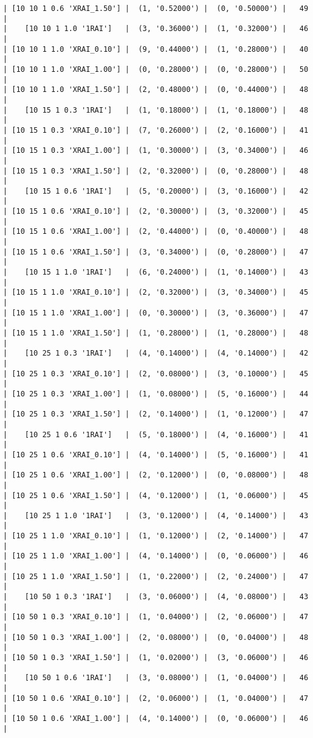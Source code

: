 \documentclass{article}
\begin{document}
\begin{verbatim}
| [10 10 1 0.6 'XRAI_1.50'] |  (1, '0.52000') |  (0, '0.50000') |   49  |
|    [10 10 1 1.0 '1RAI']   |  (3, '0.36000') |  (1, '0.32000') |   46  |
| [10 10 1 1.0 'XRAI_0.10'] |  (9, '0.44000') |  (1, '0.28000') |   40  |
| [10 10 1 1.0 'XRAI_1.00'] |  (0, '0.28000') |  (0, '0.28000') |   50  |
| [10 10 1 1.0 'XRAI_1.50'] |  (2, '0.48000') |  (0, '0.44000') |   48  |
|    [10 15 1 0.3 '1RAI']   |  (1, '0.18000') |  (1, '0.18000') |   48  |
| [10 15 1 0.3 'XRAI_0.10'] |  (7, '0.26000') |  (2, '0.16000') |   41  |
| [10 15 1 0.3 'XRAI_1.00'] |  (1, '0.30000') |  (3, '0.34000') |   46  |
| [10 15 1 0.3 'XRAI_1.50'] |  (2, '0.32000') |  (0, '0.28000') |   48  |
|    [10 15 1 0.6 '1RAI']   |  (5, '0.20000') |  (3, '0.16000') |   42  |
| [10 15 1 0.6 'XRAI_0.10'] |  (2, '0.30000') |  (3, '0.32000') |   45  |
| [10 15 1 0.6 'XRAI_1.00'] |  (2, '0.44000') |  (0, '0.40000') |   48  |
| [10 15 1 0.6 'XRAI_1.50'] |  (3, '0.34000') |  (0, '0.28000') |   47  |
|    [10 15 1 1.0 '1RAI']   |  (6, '0.24000') |  (1, '0.14000') |   43  |
| [10 15 1 1.0 'XRAI_0.10'] |  (2, '0.32000') |  (3, '0.34000') |   45  |
| [10 15 1 1.0 'XRAI_1.00'] |  (0, '0.30000') |  (3, '0.36000') |   47  |
| [10 15 1 1.0 'XRAI_1.50'] |  (1, '0.28000') |  (1, '0.28000') |   48  |
|    [10 25 1 0.3 '1RAI']   |  (4, '0.14000') |  (4, '0.14000') |   42  |
| [10 25 1 0.3 'XRAI_0.10'] |  (2, '0.08000') |  (3, '0.10000') |   45  |
| [10 25 1 0.3 'XRAI_1.00'] |  (1, '0.08000') |  (5, '0.16000') |   44  |
| [10 25 1 0.3 'XRAI_1.50'] |  (2, '0.14000') |  (1, '0.12000') |   47  |
|    [10 25 1 0.6 '1RAI']   |  (5, '0.18000') |  (4, '0.16000') |   41  |
| [10 25 1 0.6 'XRAI_0.10'] |  (4, '0.14000') |  (5, '0.16000') |   41  |
| [10 25 1 0.6 'XRAI_1.00'] |  (2, '0.12000') |  (0, '0.08000') |   48  |
| [10 25 1 0.6 'XRAI_1.50'] |  (4, '0.12000') |  (1, '0.06000') |   45  |
|    [10 25 1 1.0 '1RAI']   |  (3, '0.12000') |  (4, '0.14000') |   43  |
| [10 25 1 1.0 'XRAI_0.10'] |  (1, '0.12000') |  (2, '0.14000') |   47  |
| [10 25 1 1.0 'XRAI_1.00'] |  (4, '0.14000') |  (0, '0.06000') |   46  |
| [10 25 1 1.0 'XRAI_1.50'] |  (1, '0.22000') |  (2, '0.24000') |   47  |
|    [10 50 1 0.3 '1RAI']   |  (3, '0.06000') |  (4, '0.08000') |   43  |
| [10 50 1 0.3 'XRAI_0.10'] |  (1, '0.04000') |  (2, '0.06000') |   47  |
| [10 50 1 0.3 'XRAI_1.00'] |  (2, '0.08000') |  (0, '0.04000') |   48  |
| [10 50 1 0.3 'XRAI_1.50'] |  (1, '0.02000') |  (3, '0.06000') |   46  |
|    [10 50 1 0.6 '1RAI']   |  (3, '0.08000') |  (1, '0.04000') |   46  |
| [10 50 1 0.6 'XRAI_0.10'] |  (2, '0.06000') |  (1, '0.04000') |   47  |
| [10 50 1 0.6 'XRAI_1.00'] |  (4, '0.14000') |  (0, '0.06000') |   46  |

\end{verbatim}
\end{document}
